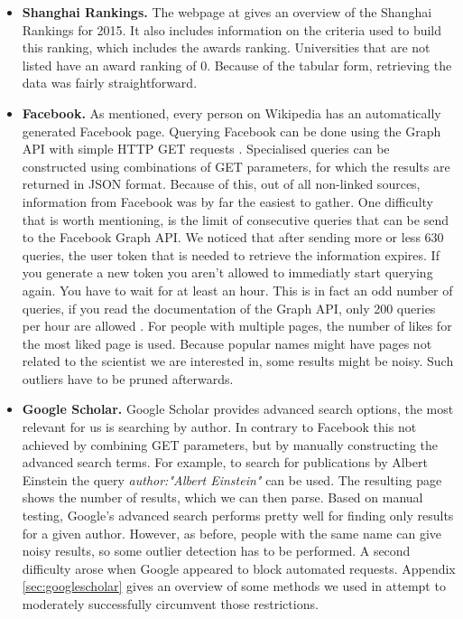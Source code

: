 \begin{itemize}
\item{\textbf{Shanghai Rankings. }} 	
The webpage at \cite{rankings} gives an overview of the Shanghai Rankings for 2015. 
It also includes  information on the criteria used to build this ranking, which includes the awards ranking. Universities that are not listed have an award ranking of 0. Because of the tabular form, retrieving the data was fairly straightforward.

\item{\textbf{Facebook. }} As mentioned, every person on Wikipedia has an automatically generated Facebook page. Querying Facebook can be done using the Graph API with simple HTTP GET requests \cite{graphAPI}. Specialised queries can be constructed using combinations of GET parameters, for which the results are returned in JSON format. Because of this, out of all non-linked sources, information from Facebook was by far the easiest to gather. One difficulty that is worth mentioning, is the limit of consecutive queries that can be send to the Facebook Graph API.
We noticed that after sending more or less 630 queries, the user token that is needed to retrieve the information expires. If you generate a new token you aren't allowed to immediatly start querying again. You have to wait for at least an hour. 
This is in fact an odd number of queries, if you read the documentation of the Graph API, only 200 queries per hour are allowed \cite{graphAPIlimit}.
For people with multiple pages, the number of likes for the most liked page is used. Because popular names might have pages not related to the scientist we are interested in, some results might be noisy. Such outliers have to be pruned afterwards.

\item{\textbf{Google Scholar. }} Google Scholar provides advanced search options, the most relevant for us is searching by author. In contrary to Facebook this not achieved by combining GET parameters, but by manually constructing the advanced search terms. For example, to search for publications by Albert Einstein the query  \emph{author:"Albert Einstein"} can be used. The resulting page shows the number of results, which we can then parse. Based on manual testing, Google's advanced search performs pretty well for finding only results for a given author. However, as before, people with the same name can give noisy results, so some outlier detection has to be performed. A second difficulty arose when Google appeared to block automated requests. Appendix \ref{sec:googlescholar} gives an overview of some methods we used in attempt to moderately successfully circumvent those restrictions.
\end{itemize}

